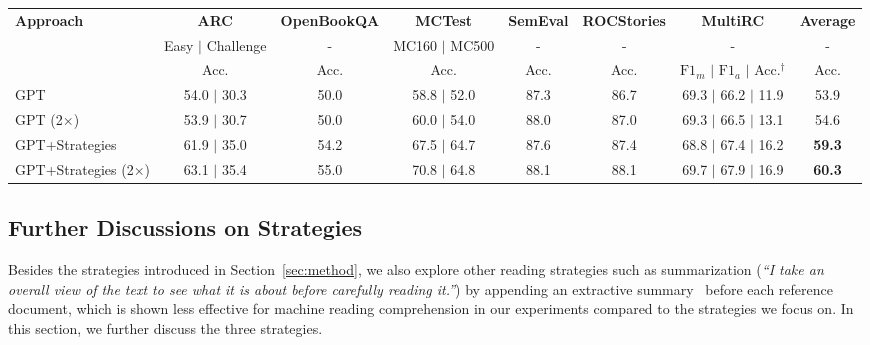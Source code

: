 \documentclass[11pt,a4paper]{article}
\newcommand{\ie}{{i.e.}}
\begin{document}
\begin{table*}[h!]
\scriptsize
\centering
\begin{tabular}{lcccccc|c}
\toprule
\multirow{2}{*}{\bf Approach}     & \bf ARC   & \bf OpenBookQA  & \bf MCTest & \bf SemEval  & \bf ROCStories & \bf MultiRC & \bf Average \\

                     & Easy $|$ Challenge    & - & MC160 $|$ MC500   & -            & -  & - & - \\
               & Acc.      & Acc.     & Acc.   & Acc.  & Acc. & $\text{F1}_{m}$ $|$ $\text{F1}_{a}$ $|$ Acc.$^\dagger$ & Acc. \\
\midrule
GPT   & 54.0 $|$ 30.3   & 50.0 & 58.8 $|$ 52.0   & 87.3 & 86.7 & 69.3 $|$ 66.2 $|$ 11.9 & 53.9 \\
GPT (2$\times$)  & 53.9 $|$ 30.7 &  50.0 & 60.0 $|$ 54.0 & 88.0  & 87.0 &  69.3 $|$ 66.5 $|$ 13.1 & 54.6 \\
GPT+Strategies  &  61.9 $|$ 35.0 &  54.2 & 67.5 $|$ 64.7 &87.6  &87.4 &68.8	$|$ 67.4  $|$ 16.2 & \bf 59.3 \\
GPT+Strategies (2$\times$)  &  63.1 $|$  35.4  &   55.0 &  70.8 $|$  64.8  &  88.1 &  88.1 &   69.7 $|$  67.9 $|$  16.9 & \bf 60.3 \\
\bottomrule
\end{tabular}
\caption{Performance (\%) on the test sets of ARC, OpenBookQA, MCTest, SemEval-2018 Task 11, and ROCStories and the development set of MultiRC using the target data only (\ie, without the data flow 1 and 2 boxed in Figure~\ref{fig:overview}) (Acc.: Accuracy; $\text{F1}_m$: macro-average F1; $\text{F1}_a$: micro-average F1; $^\dagger$: using the joint exact match accuracy (\ie, $\text{EM}_{0}$ reported by the official evaluation~\cite{khashabi2018looking})). \label{tab:eval:notransfer}}
\end{table*}



\subsection{Further Discussions on Strategies}
\label{sec:eval:other_strategy}


Besides the strategies introduced in Section~\ref{sec:method}, we also explore other reading strategies such as {\sc summarization} (\emph{``I take an overall view of the text to see what it is about before carefully reading it.''}) by appending an extractive summary~\cite{boudin2015concept} before each reference document, which is shown less effective for machine reading comprehension in our experiments compared to the strategies we focus on. In this section, we further discuss the three strategies. 
\end{document}
